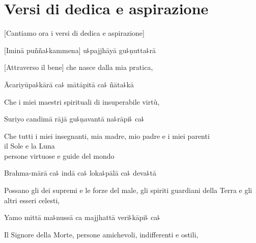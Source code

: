 \chapter [Dedica e aspirazione]{Versi di dedica e aspirazione}


\delegateSetUseNext

\begin{leader}
\end{leader}

\begin{english}
 [Cantiamo ora i versi di dedica e aspirazione]
\end{english}

[Iminā puñña꜕kammena] u꜕pajjhāyā gu꜕ṇutta꜕rā\\

\begin{english}
[Attraverso il bene] che nasce dalla mia pratica,
\end{english}

Ācariyūpa꜕kārā ca꜕ mātāpitā ca꜕ ñāta꜕kā\\

  \begin{english}
Che i miei maestri spirituali di insuperabile virtù,
  \end{english}

Suriyo candimā rājā gu꜕ṇavantā na꜕rāpi꜕ ca꜕\\

  \begin{english}
 Che tutti i miei insegnanti, mia madre, mio padre e i miei parenti\\ 
 il Sole e la Luna\\
persone virtuose e guide del mondo\\
  \end{english} 

Brahma-mārā ca꜕ indā ca꜕ loka꜕pālā ca꜕ deva꜕tā\\

  \begin{english}
Possano gli dei supremi e le forze del male, gli spiriti guardiani della Terra e gli altri esseri celesti,
  \end{english}

Yamo mittā ma꜕nussā ca majjhattā veri꜕kāpi꜕ ca꜕\\
  \begin{english}
    Il Signore della Morte, persone amichevoli, indifferenti e ostili,
  \end{english}

